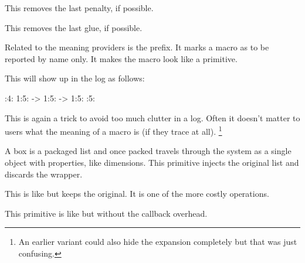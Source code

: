 {\tttf \getbuffer}

\stopnewprimitive

\startoldprimitive[title={\prm {unpenalty}}]

This removes the last penalty, if possible.

\stopoldprimitive

\startoldprimitive[title={\prm {unskip}}]

This removes the last glue, if possible.

\stopoldprimitive

\startnewprimitive[title={\prm {untraced}}]

Related to the meaning providers is the  prefix. It marks a macro
as to be reported by name only. It makes the macro look like a primitive.

\starttyping
         \def\foo{}
\untraced\def\oof{}

\scratchtoks{\foo\foo\oof\oof}

\tracingall \the\scratchtoks \tracingnone
\stoptyping

This will show up in the log as follows:

:4: {\the}
1:5: \foo ->
1:5: \foo ->
1:5: :5: \oof
\stoptyping

This is again a trick to avoid too much clutter in a log. Often it doesn't matter
to users what the meaning of a macro is (if they trace at all). \footnote {An
earlier variant could also hide the expansion completely but that was just
confusing.}

\stopnewprimitive

\startoldprimitive[title={\prm {unvbox}}]

A box is a packaged list and once packed travels through the system as a single
object with properties, like dimensions. This primitive injects the original list
and discards the wrapper.

\stopoldprimitive

\startoldprimitive[title={\prm {unvcopy}}]

This is like  but keeps the original. It is one of the more costly
operations.

\stopoldprimitive

\startnewprimitive[title={\prm {unvpack}}]

This primitive is like  but without the callback overhead.

\stopnewprimitive

\startoldprimitive[title={\prm {uppercase}}]

